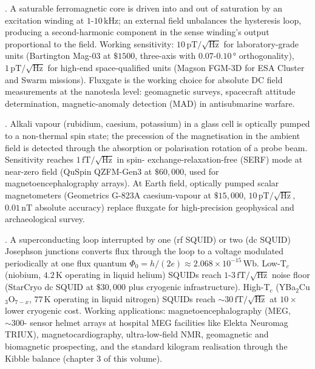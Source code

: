 . A saturable ferromagnetic core
is driven into and out of saturation by an excitation winding at
$1$-$10\,\si{\kilo\hertz}$; an external field unbalances the
hysteresis loop, producing a second-harmonic component in the
sense winding's output proportional to the field. Working
sensitivity: $10\,\si{\pico\tesla}/\sqrt{\si{\hertz}}$ for
laboratory-grade units (Bartington Mag-03 at $\$1500$, three-axis
with $0.07$-$0.10\,\si{\degree}$ orthogonality), $1\,\si{\pico
\tesla}/\sqrt{\si{\hertz}}$ for high-end space-qualified units
(Magson FGM-3D for ESA Cluster and Swarm missions). Fluxgate is
the working choice for absolute DC field measurements at the
nanotesla level: geomagnetic surveys, spacecraft attitude
determination, magnetic-anomaly detection (MAD) in
antisubmarine warfare.

. Alkali vapour
(rubidium, caesium, potassium) in a glass cell is optically
pumped to a non-thermal spin state; the precession of the
magnetisation in the ambient field is detected through the
absorption or polarisation rotation of a probe beam. Sensitivity
reaches $1\,\si{\femto\tesla}/\sqrt{\si{\hertz}}$ in spin-
exchange-relaxation-free (SERF) mode at near-zero field
(QuSpin QZFM-Gen3 at $\$60{,}000$, used for magnetoencephalography
arrays). At Earth field, optically pumped scalar magnetometers
(Geometrics G-823A caesium-vapour at $\$15{,}000$, $10\,\si{\pico
\tesla}/\sqrt{\si{\hertz}}$, $0.01\,\si{\nano\tesla}$ absolute
accuracy) replace fluxgate for high-precision geophysical and
archaeological survey.

.
A superconducting loop interrupted by one (rf SQUID) or two (dc
SQUID) Josephson junctions converts flux through the loop to a
voltage modulated periodically at one flux quantum $\Phi_{0} =
h/(2e) \approx 2.068 \times 10^{-15}\,\si{\weber}$. Low-T$_{c}$
(niobium, $4.2\,\si{\kelvin}$ operating in liquid helium) SQUIDs
reach $1$-$3\,\si{\femto\tesla}/\sqrt{\si{\hertz}}$ noise floor
(StarCryo dc SQUID at $\$30{,}000$ plus cryogenic infrastructure).
High-T$_{c}$ (YBa$_{2}$Cu$_{3}$O$_{7-x}$, $77\,\si{\kelvin}$
operating in liquid nitrogen) SQUIDs reach $\sim 30\,\si{\femto
\tesla}/\sqrt{\si{\hertz}}$ at $10\times$ lower cryogenic cost.
Working applications: magnetoencephalography (MEG, $\sim 300$-
sensor helmet arrays at hospital MEG facilities like Elekta
Neuromag TRIUX), magnetocardiography, ultra-low-field NMR,
geomagnetic and biomagnetic prospecting, and the standard kilogram
realisation through the Kibble balance (chapter 3 of this
volume).

